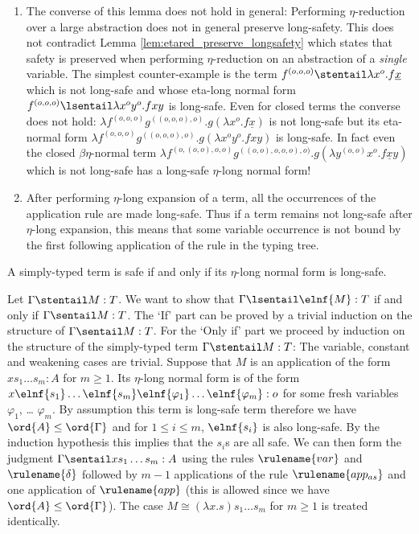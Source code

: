 \begin{remark}\hfill
\begin{enumerate}
\item
The converse of this lemma does not hold in general: Performing
$\eta$-reduction over a large abstraction does not in general
preserve long-safety. This does not contradict Lemma
  \ref{lem:etared_preserve_longsafety} which states that safety is
  preserved when performing $\eta$-reduction on an abstraction
  of a \emph{single} variable. The simplest counter-example is
  the
 term $f^{(o,o,o)} \stentail \lambda x^o . f \underline{x}$ which is not long-safe and
whose eta-long normal form $f^{(o,o,o)} \lsentail \lambda x^o y^o .
f x y$ is long-safe. Even for closed terms the converse does not
hold: $\lambda f^{(o,o,o)} g^{((o,o,o),o)} . g(\lambda x^o . f
\underline{x})$ is not long-safe but its eta-normal form $\lambda f^{(o,o,o)}
g^{((o,o,o),o)} . g(\lambda x^o y^o. f x y)$ is long-safe. In fact
even the closed $\beta\eta$-normal term $\lambda
f^{(o,(o,o),o,o)} g^{((o,o),o,o,o),o)} . g(\lambda y^{(o,o)} x^o
. f \underline{x} y)$ which is not long-safe has a long-safe $\eta$-long normal form!

  \item After performing $\eta$-long expansion of a term, all the occurrences of the application rule are made long-safe. Thus if a term remains not long-safe after $\eta$-long expansion, this means that
  some variable occurrence is not bound by the
  first following application of the  rule in the
  typing tree.
  \end{enumerate}
\end{remark}

\begin{lemma}
  \label{lem:safe_iff_etalong_lsafe}
  A simply-typed term is safe if and only if its $\eta$-long normal form is long-safe.
\end{lemma}
\proof Let $\Gamma \stentail M : T$. We want to show that $\Gamma
\lsentail \elnf{M} : T$ if and only if $\Gamma \sentail M : T$. The
`If' part can be proved by a trivial induction on the structure of
$\Gamma \sentail M : T$. For the `Only if' part we proceed by
induction on the structure of the simply-typed term $\Gamma
\stentail M : T$: The variable, constant and weakening cases are
trivial. Suppose that $M$ is an application of the form $x s_1
\ldots s_m : A$ for $m\geq 1$. Its $\eta$-long normal form is of the
form $x \elnf{s_1} \ldots \elnf{s_m} \elnf{\varphi_1} \ldots
\elnf{\varphi_m}: o$ for some fresh variables $\varphi_1$, \ldots
$\varphi_m$. By assumption this term is long-safe term therefore we
have $\ord{A}\leq\ord{\Gamma}$ and for $1\leq i \leq m$,
$\elnf{s_i}$ is also long-safe. By the induction hypothesis this
implies that the $s_i$s are all safe. We can then form the judgment
$\Gamma \sentail x s_1 \ldots s_m : A$ using the rules
$\rulename{var}$ and $\rulename{\delta}$ followed by $m-1$
applications of the rule $\rulename{app_{as}}$ and one application
of $\rulename{app}$ (this is allowed since we have
$\ord{A}\leq\ord{\Gamma}$). The case $M\cong (\lambda x. s) s_1
\ldots s_m$ for $m\geq 1$ is treated identically.

